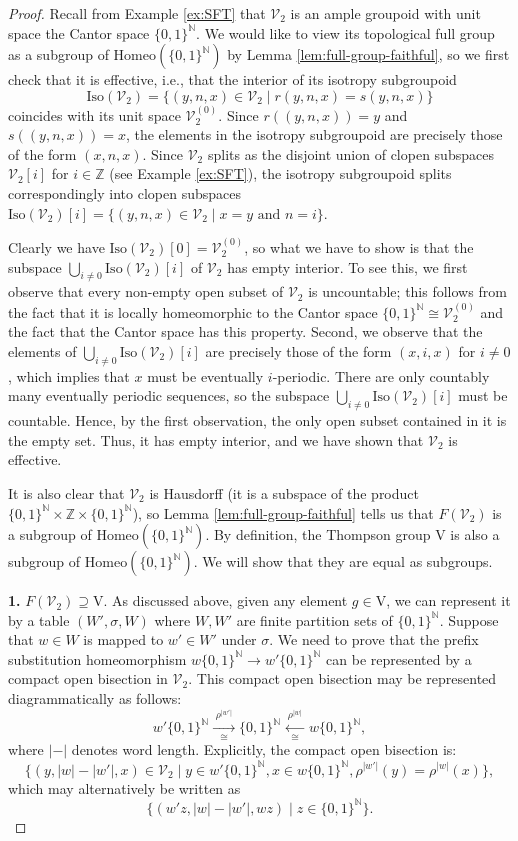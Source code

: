 \documentclass[10pt,a4paper]{amsart}
\numberwithin{equation}{section}
\numberwithin{figure}{section}
\theoremstyle{definition}
\newcommand{\cV}{\mathcal{V}}
\newcommand{\bN}{\mathbb{N}}
\newcommand{\bZ}{\mathbb{Z}}
\newcommand{\V}{\mathrm{V}}
\newcommand{\Homeo}{\mathrm{Homeo}}
\begin{document}
\begin{proof}
Recall from Example \ref{ex:SFT} that $\cV_2$ is an ample groupoid with unit space the Cantor space $\{0,1\}^\bN$. We would like to view its topological full group as a subgroup of $\Homeo(\{0,1\}^\bN)$ by Lemma \ref{lem:full-group-faithful}, so we first check that it is effective, i.e., that the interior of its isotropy subgroupoid
\[
\mathrm{Iso}(\cV_2) = \{(y,n,x) \in \cV_2 \mid r(y,n,x) = s(y,n,x)\}
\]
coincides with its unit space $\cV_2^{(0)}$. Since $r((y,n,x)) = y$ and $s((y,n,x)) = x$, the elements in the isotropy subgroupoid are precisely those of the form $(x,n,x)$. Since $\cV_2$ splits as the disjoint union of clopen subspaces $\cV_2[i]$ for $i \in \bZ$ (see Example \ref{ex:SFT}), the isotropy subgroupoid splits correspondingly into clopen subspaces $\mathrm{Iso}(\cV_2)[i] = \{ (y,n,x) \in \cV_2 \mid x=y \text{ and } n=i \}$.

Clearly we have $\mathrm{Iso}(\cV_2)[0] = \cV_2^{(0)}$, so what we have to show is that the subspace $\bigcup_{i\neq 0} \mathrm{Iso}(\cV_2)[i]$ of $\cV_2$ has empty interior. To see this, we first observe that every non-empty open subset of $\cV_2$ is uncountable; this follows from the fact that it is locally homeomorphic to the Cantor space $\{0,1\}^\bN \cong \cV_2^{(0)}$ and the fact that the Cantor space has this property. Second, we observe that the elements of $\bigcup_{i\neq 0} \mathrm{Iso}(\cV_2)[i]$ are precisely those of the form $(x,i,x)$ for $i \neq 0$, which implies that $x$ must be eventually $i$-periodic. There are only countably many eventually periodic sequences, so the subspace $\bigcup_{i\neq 0} \mathrm{Iso}(\cV_2)[i]$ must be countable. Hence, by the first observation, the only open subset contained in it is the empty set. Thus, it has empty interior, and we have shown that $\cV_2$ is effective.

It is also clear that $\cV_2$ is Hausdorff (it is a subspace of the product $\{0,1\}^\bN \times \bZ \times \{0,1\}^\bN$), so Lemma \ref{lem:full-group-faithful} tells us that $F(\mathcal{V}_2)$ is a subgroup of 
$\Homeo(\{0,1\}^\bN)$. By definition, the Thompson group $\V$ is also a subgroup of $\Homeo(\{0,1\}^\bN)$. We will show that they are equal as subgroups.

\textbf{1.} $F(\mathcal{V}_2) \supseteq \V$.
As discussed above, given any element $g\in \V$, we can represent it by a table $(W',\sigma,W)$ where $W,W'$ are finite partition sets of $\{0,1\}^\bN$. Suppose that $w\in W$ is mapped to $w'\in W'$ under $\sigma$. We need to prove that the prefix substitution homeomorphism $w\{0,1\}^{\bN} \to w'\{0,1\}^{\bN}$ can be represented by a compact open bisection in $\cV_2$. This compact open bisection may be represented diagrammatically as follows:
\[
w'\{0,1\}^{\bN}  \xrightarrow[\cong]{\;\rho^{\lvert w' \rvert}\;} \{0,1\}^{\bN} \xleftarrow[\cong]{\;\rho^{\lvert w \rvert}\;} w\{0,1\}^{\bN},
\]
where $\lvert - \rvert$ denotes word length. Explicitly, the compact open bisection is:
\[
\{(y , \lvert w \rvert - \lvert w' \rvert , x) \in \cV_2 \mid y\in w'\{0,1\}^{\bN}, x\in w\{0,1\}^{\bN},  \rho^{\lvert w' \rvert}(y) =\rho^{\lvert w \rvert}(x)\} ,
\]
which may alternatively be written as
\[
\{ (w'z , \lvert w \rvert - \lvert w' \rvert , wz) \mid z \in \{0,1\}^\bN \} .
\]


\end{proof}
\end{document}

